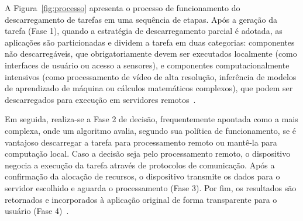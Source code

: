 
A Figura~\ref{fig:processo} apresenta o  processo de funcionamento do descarregamento de tarefas em uma sequência de etapas. Após a geração da tarefa (Fase 1), quando a estratégia de descarregamento parcial é adotada, as aplicações são particionadas e dividem a tarefa em duas categorias: componentes não descarregáveis, que obrigatoriamente devem ser executados localmente (como interfaces de usuário ou acesso a sensores), e componentes computacionalmente intensivos (como processamento de vídeo de alta resolução, inferência de modelos de aprendizado de máquina ou cálculos matemáticos complexos), que podem ser descarregados para execução em servidores remotos~\cite{Mach2017, Zhang2023}. 

Em seguida, realiza-se a Fase 2 de decisão, frequentemente apontada como a mais complexa, onde um algoritmo avalia, segundo sua política de funcionamento, se é vantajoso descarregar a tarefa para processamento remoto ou mantê-la para computação local. Caso a decisão seja pelo processamento remoto, o dispositivo negocia a execução da tarefa através de protocolos de comunicação. Após a confirmação da alocação de recursos, o dispositivo transmite os dados para o servidor escolhido e aguarda o processamento (Fase 3). Por fim, os resultados são retornados e incorporados à aplicação original de forma transparente para o usuário (Fase 4)~\cite{Boukerche2020}.


